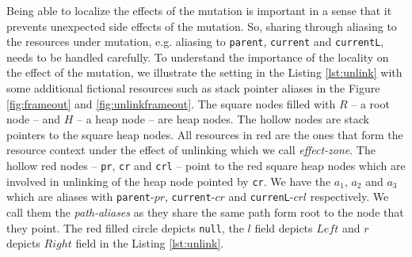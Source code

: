 Being able to localize the effects of the mutation is important in a sense that it prevents unexpected side effects of the mutation. So, sharing through aliasing to the resources under mutation, e.g. aliasing to \texttt{parent}, \texttt{current} and \texttt{currentL}, needs to be handled carefully. To understand the importance of the locality on the effect of the mutation, we illustrate the setting in the Listing \ref{lst:unlink} with some additional fictional resources such as stack pointer aliases in the Figure \ref{fig:frameout} and \ref{fig:unlinkframeout}. The square nodes filled with $R$ -- a root node -- and $H$ -- a heap node -- are heap nodes. The hollow nodes are stack pointers to the square heap nodes. All resources in red are the ones that form the resource context under the effect of unlinking which we call \textit{effect-zone}. The hollow red nodes -- \texttt{pr}, \texttt{cr} and \texttt{crl} -- point to the red square heap nodes which are involved in unlinking of the heap node pointed by \texttt{cr}. We have the $a_1$, $a_2$ and $a_3$ which are aliases with \texttt{parent}-$pr$, \texttt{current}-$cr$ and \texttt{currenL}-$crl$ respectively. We call them the \textit{path-aliases} as they share the same path form root to the node that they point. The red filled circle depicts \texttt{null}, the $l$ field depicts $Left$ and $r$ depicts $Right$ field in the Listing \ref{lst:unlink}.

